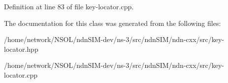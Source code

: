Definition at line 83 of file key-\/locator.\+cpp.



The documentation for this class was generated from the following files\+:\begin{DoxyCompactItemize}
\item 
/home/network/\+N\+S\+O\+L/ndn\+S\+I\+M-\/dev/ns-\/3/src/ndn\+S\+I\+M/ndn-\/cxx/src/key-\/locator.\+hpp\item 
/home/network/\+N\+S\+O\+L/ndn\+S\+I\+M-\/dev/ns-\/3/src/ndn\+S\+I\+M/ndn-\/cxx/src/key-\/locator.\+cpp\end{DoxyCompactItemize}
